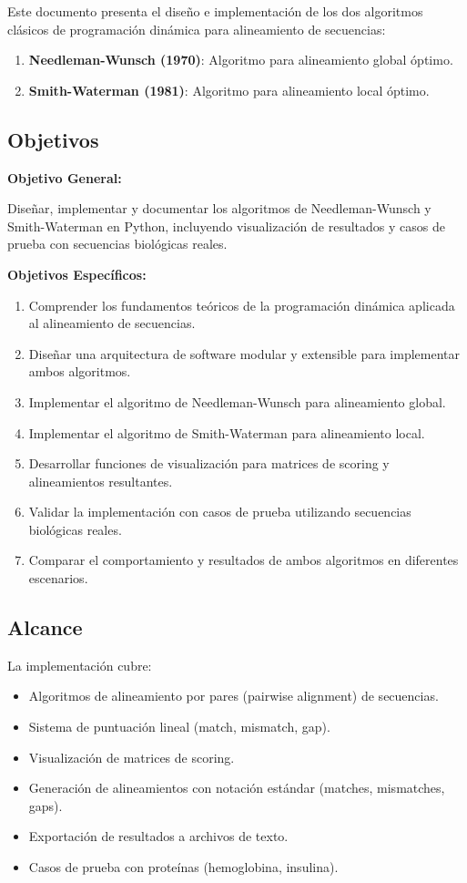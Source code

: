 \documentclass[12pt,a4paper]{article}
\begin{document}
Este documento presenta el diseño e implementación de los dos algoritmos clásicos de programación dinámica para alineamiento de secuencias:

\begin{enumerate}
    \item \textbf{Needleman-Wunsch (1970)}: Algoritmo para alineamiento global óptimo.
    \item \textbf{Smith-Waterman (1981)}: Algoritmo para alineamiento local óptimo.
\end{enumerate}

\subsection{Objetivos}

\textbf{Objetivo General:}

Diseñar, implementar y documentar los algoritmos de Needleman-Wunsch y Smith-Waterman en Python, incluyendo visualización de resultados y casos de prueba con secuencias biológicas reales.

\textbf{Objetivos Específicos:}

\begin{enumerate}
    \item Comprender los fundamentos teóricos de la programación dinámica aplicada al alineamiento de secuencias.
    \item Diseñar una arquitectura de software modular y extensible para implementar ambos algoritmos.
    \item Implementar el algoritmo de Needleman-Wunsch para alineamiento global.
    \item Implementar el algoritmo de Smith-Waterman para alineamiento local.
    \item Desarrollar funciones de visualización para matrices de scoring y alineamientos resultantes.
    \item Validar la implementación con casos de prueba utilizando secuencias biológicas reales.
    \item Comparar el comportamiento y resultados de ambos algoritmos en diferentes escenarios.
\end{enumerate}

\subsection{Alcance}

La implementación cubre:

\begin{itemize}
    \item Algoritmos de alineamiento por pares (pairwise alignment) de secuencias.
    \item Sistema de puntuación lineal (match, mismatch, gap).
    \item Visualización de matrices de scoring.
    \item Generación de alineamientos con notación estándar (matches, mismatches, gaps).
    \item Exportación de resultados a archivos de texto.
    \item Casos de prueba con proteínas (hemoglobina, insulina).
\end{itemize}
\end{document}

